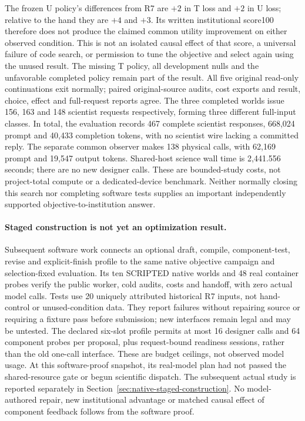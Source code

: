 The frozen U policy's differences from R7 are $+2$ in T loss and $+2$ in U loss;
relative to the hand they are $+4$ and $+3$. Its written institutional score100
therefore does not produce the claimed common utility improvement on either
observed condition. This is not an isolated causal effect of that score, a
universal failure of code search, or permission to tune the objective and
select again using the unused result. The missing T policy, all development
nulls and the unfavorable completed policy remain part of the result.
All five original read-only continuations exit normally; paired original-source
audits, cost exports and result, choice, effect and full-request reports agree.
The three completed worlds issue 156, 163 and 148 scientist requests respectively,
forming three different full-input classes. In total, the evaluation records
467 complete scientist responses, 668,024 prompt and 40,433 completion tokens,
with no scientist wire lacking a committed reply. The separate common observer
makes 138 physical calls, with 62,169 prompt and 19,547 output tokens. Shared-host
science wall time is 2,441.556 seconds; there are no new designer calls. These
are bounded-study costs, not project-total compute or a dedicated-device benchmark.
Neither normally closing this search nor completing software tests supplies
an important independently supported objective-to-institution answer.

\paragraph{Staged construction is not yet an optimization result.}
Subsequent software work connects an optional draft, compile, component-test,
revise and explicit-finish profile to the same native objective campaign and
selection-fixed evaluation. Its ten SCRIPTED native worlds and 48 real
container probes verify the public worker, cold audits, costs and handoff,
with zero actual model calls. Tests use 20 uniquely attributed historical R7
inputs, not hand-control or unused-condition data. They report failures without
repairing source or requiring a fixture pass before submission; new interfaces
remain legal and may be untested. The declared six-slot profile permits at most
16 designer calls and 64 component probes per proposal, plus request-bound
readiness sessions, rather than the old one-call interface. These are budget
ceilings, not observed model usage. At this software-proof snapshot, its
real-model plan had not passed the shared-resource gate or begun scientific
dispatch. The subsequent actual study is reported separately in
Section~\ref{sec:native-staged-construction}. No model-authored repair, new institutional advantage or
matched causal effect of component feedback follows from the software proof.
\FloatBarrier
